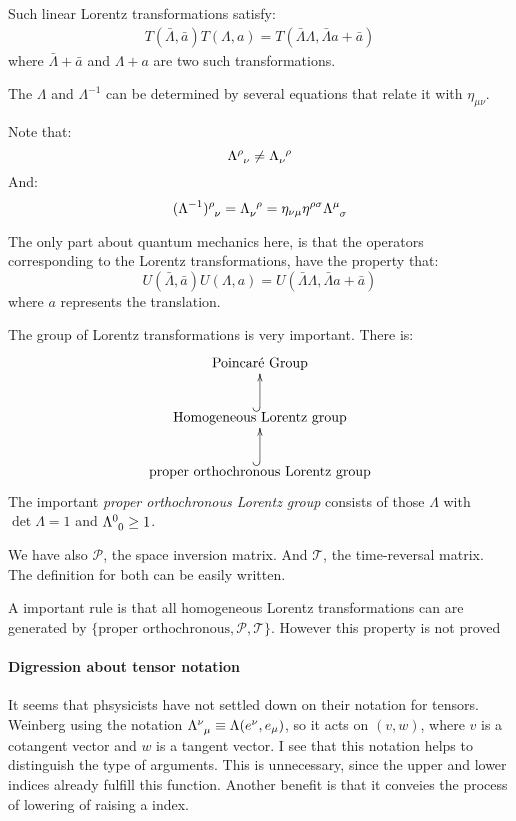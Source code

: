 Such linear Lorentz transformations satisfy:
\begin{align}
    T(\bar{\Lambda},\bar{a})T(\Lambda,a) = 
        T(\bar{\Lambda}\Lambda, \bar{\Lambda}a+\bar{a})
\end{align}
where $\bar{\Lambda}+\bar{a}$ and $\Lambda+a$ are two such 
transformations.

The $\Lambda$ and $\Lambda^{-1}$ can be determined by several 
equations that relate it with $\eta_{\mu\nu}$. 

Note that:
\[ \Lambda\indices{^\rho_\nu} \neq \Lambda\indices{_\nu^\rho} \]
And:
\begin{equation}
    \label{eq:2.3_Quantum_Lorentz_Transformations transformation_matrix}
    (\Lambda^{-1})\indices{^\rho_\nu} = 
        \Lambda\indices{_\nu^\rho} = 
        \eta_{\nu\mu}\eta^{\rho\sigma} \Lambda\indices{^\mu_\sigma}
\end{equation}

The only part about quantum mechanics here, is that the operators
corresponding to the Lorentz transformations, have the property that:
\begin{equation}
    U(\bar\Lambda,\bar{a})U(\Lambda, a) = 
        U(\bar\Lambda\Lambda, \bar\Lambda a + \bar{a})
\end{equation}
where $a$ represents the translation.

The group of Lorentz transformations is very important. There is:
\[
    \xymatrix{ 
    \text{Poincar\'e Group}  \\
    \text{Homogeneous Lorentz group} \ar@{^{(}->}[u] \\
    \text{proper orthochronous Lorentz group}\ar@{^{(}->}[u]
    }
\]
The important \textit{proper orthochronous Lorentz group} consists
of those $\Lambda$ with $\det \Lambda = 1$ and 
$\Lambda\indices{^0_0} \geq 1$.

We have also $ \mathscr{P}$, the space inversion matrix. And
\(\mathscr{T}\), the time-reversal matrix. The definition for
both can be easily written.

A important rule is that all homogeneous Lorentz transformations can
are generated by 
\(\{\text{proper orthochronous}, \mathscr{P}, \mathscr{T} \}\).
However this property is not proved

\paragraph{Digression about tensor notation} It seems that phsysicists
have not settled down on their notation for tensors. Weinberg using
the notation $\Lambda\indices{^\nu_\mu} \equiv \Lambda(e^\nu,e_\mu)$,
so it acts on $(v,w)$, where $v$ is a cotangent vector and $w$ is a
tangent vector. I see that this notation helps to distinguish the
type of arguments. This is unnecessary, since the upper and lower
indices already fulfill this function. Another benefit is that it
conveies the process of lowering of raising a index. 

